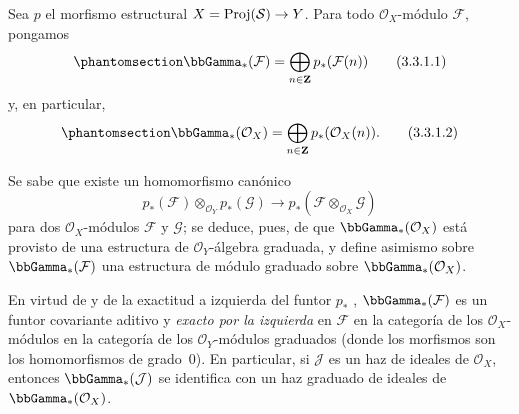\documentclass[oneside,10pt]{amsart}
\makeatletter
\newcommand{\ega@arrow}[2]{\mathchoice{#1}{#2}{#2}{#2}}
\renewcommand{\to}{\ega@arrow{\longrightarrow}{\rightarrow}}
\newcommand{\oldpage}[2][]{\marginnote{\normalfont\footnotesize\textbf{#1}~|~#2}\ignorespaces}
\let\EGAOriginalLabel\label
\renewcommand{\label}[1]{\phantomsection\EGAOriginalLabel{#1}}
\makeatother
\begin{document}
\begin{env}[3.3.1]
\label{II.3.3.1-fr}
Sea $p$ el morfismo estructural $X=\operatorname{Proj}(\mathcal{S})\to Y$.
Para todo $\mathcal{O}_X$-módulo $\mathcal{F}$, pongamos
\[
\label{II.3.3.1.1-fr}
  \bbGamma_*(\mathcal{F})
  =\bigoplus_{n\in\mathbf{Z}}p_*(\mathcal{F}(n))
\tag{3.3.1.1}
\]
\oldpage[II]{57}
y, en particular,
\[
\label{II.3.3.1.2-fr}
  \bbGamma_*(\mathcal{O}_X)
  =\bigoplus_{n\in\mathbf{Z}}p_*(\mathcal{O}_X(n)).
\tag{3.3.1.2}
\]

Se sabe  que existe un homomorfismo canónico
\[
  p_*(\mathcal{F})\otimes_{\mathcal{O}_Y}p_*(\mathcal{G})
  \longrightarrow
  p_*(\mathcal{F}\otimes_{\mathcal{O}_X}\mathcal{G})
\]
para dos $\mathcal{O}_X$-módulos $\mathcal{F}$ y $\mathcal{G}$; se deduce, pues, de  que $\bbGamma_*(\mathcal{O}_X)$ está provisto de una estructura de $\mathcal{O}_Y$-álgebra graduada, y  define asimismo sobre $\bbGamma_*(\mathcal{F})$ una estructura de módulo graduado sobre $\bbGamma_*(\mathcal{O}_X)$.

En virtud de  y de la exactitud a izquierda del funtor $p_*$ , $\bbGamma_*(\mathcal{F})$ es un funtor covariante aditivo y \emph{exacto por la izquierda} en $\mathcal{F}$ en la categoría de los $\mathcal{O}_X$-módulos en la categoría de los $\mathcal{O}_Y$-módulos graduados (donde los morfismos son los homomorfismos de grado~$0$).
En particular, si $\mathcal{J}$ es un haz de ideales de $\mathcal{O}_X$, entonces $\bbGamma_*(\mathcal{J})$ se identifica con un haz graduado de ideales de $\bbGamma_*(\mathcal{O}_X)$.
\end{env}
\end{document}
